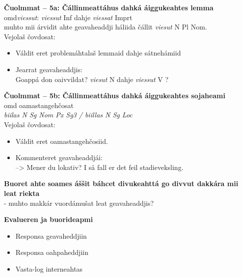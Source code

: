 \documentclass[landscape,norsk,11pt]{seminar}
\begin{document}
\begin{slide}
\newslide
\textbf{Čuolmmat -- 5a: Čállinmeattáhus dahká áiggukeahtes lemma} \\
omd\textit{viessut}: \textit{viessut} Inf dahje \textit{viessat} Imprt \\
muhto mii árvidit ahte geavaheaddji háliida čállit \textit{viesut} N Pl Nom. \\
Vejolaš čovdosat:

\begin{itemize}
\item{Váldit eret problemáhtalaš lemmaid dahje sátnehámiid}
\item{Jearrat geavaheaddjis: \\ Goappá don oaivvildat? \textit{viesut}  N dahje \textit{viessut} V }?
\end{itemize}


\newslide
\textbf{Čuolmmat -- 5b: Čállinmeattáhus dahká áiggukeahtes sojaheami} \\
omd oamastangehčosat \\
\textit{biilas N Sg Nom Px Sg3 / biillas N Sg Loc} \\

Vejolaš čovdosat:
\begin{itemize}
\item Váldit eret oamastangehčosiid.
\item Kommenteret geavaheaddjái: \\
--> Mener du lokativ? I så fall er det feil stadieveksling.
\end{itemize}


\newslide
\textbf{Buoret ahte soames áššit báhcet divukeahttá go divvut dakkára mii leat riekta} \\
- muhto makkár vuordámušat leat geavaheaddjis?

\newslide
\textbf{Evalueren ja buorideapmi}
\begin{itemize}
\item{Responsa geavaheddjiin}
\item{Responsa oahpaheddjiin}
\item{Vasta-log interneahtas}
\end{itemize}


\end{slide}
\end{document}
